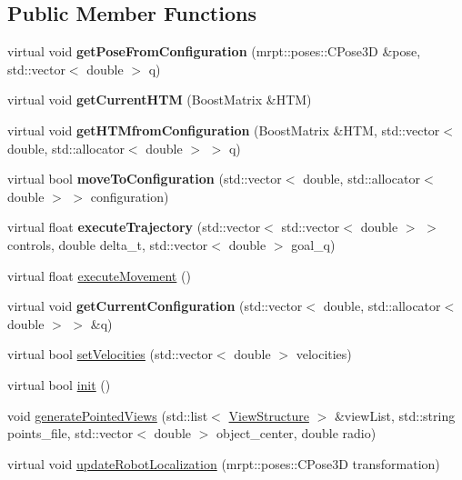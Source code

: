 \subsection*{Public Member Functions}
\begin{DoxyCompactItemize}
\item 
virtual void {\bfseries get\+Pose\+From\+Configuration} (mrpt\+::poses\+::\+C\+Pose3D \&pose, std\+::vector$<$ double $>$ q)\hypertarget{classvprFreeFlyer_ab6d24adbcd9c30b464dae8b036468394}{}\label{classvprFreeFlyer_ab6d24adbcd9c30b464dae8b036468394}

\item 
virtual void {\bfseries get\+Current\+H\+TM} (Boost\+Matrix \&H\+TM)\hypertarget{classvprFreeFlyer_ad90b7ba9c7aab39f3b27742fb3e4832d}{}\label{classvprFreeFlyer_ad90b7ba9c7aab39f3b27742fb3e4832d}

\item 
virtual void {\bfseries get\+H\+T\+Mfrom\+Configuration} (Boost\+Matrix \&H\+TM, std\+::vector$<$ double, std\+::allocator$<$ double $>$ $>$ q)\hypertarget{classvprFreeFlyer_a4ddb9bef245d3aec62cf843e29364a52}{}\label{classvprFreeFlyer_a4ddb9bef245d3aec62cf843e29364a52}

\item 
virtual bool {\bfseries move\+To\+Configuration} (std\+::vector$<$ double, std\+::allocator$<$ double $>$ $>$ configuration)\hypertarget{classvprFreeFlyer_a3363bcae45eb475c8785ff2a08f43109}{}\label{classvprFreeFlyer_a3363bcae45eb475c8785ff2a08f43109}

\item 
virtual float {\bfseries execute\+Trajectory} (std\+::vector$<$ std\+::vector$<$ double $>$ $>$ controls, double delta\+\_\+t, std\+::vector$<$ double $>$ goal\+\_\+q)\hypertarget{classvprFreeFlyer_ada428e9717d0e11e892215a4934bfa93}{}\label{classvprFreeFlyer_ada428e9717d0e11e892215a4934bfa93}

\item 
virtual float \hyperlink{classvprFreeFlyer_a8addee690a582bc74577ad79da7f02ba}{execute\+Movement} ()
\item 
virtual void {\bfseries get\+Current\+Configuration} (std\+::vector$<$ double, std\+::allocator$<$ double $>$ $>$ \&q)\hypertarget{classvprFreeFlyer_a17407e2a36c81f754e59ef2619b3f43d}{}\label{classvprFreeFlyer_a17407e2a36c81f754e59ef2619b3f43d}

\item 
virtual bool \hyperlink{classvprFreeFlyer_a9f1f0452b42a29b9cbef9cff075387ce}{set\+Velocities} (std\+::vector$<$ double $>$ velocities)
\item 
virtual bool \hyperlink{classvprFreeFlyer_a28a63f561bd1d740977a1050f10843b1}{init} ()
\item 
void \hyperlink{classvprFreeFlyer_af03adddc180ac01f0a3a49327bd763d1}{generate\+Pointed\+Views} (std\+::list$<$ \hyperlink{classViewStructure}{View\+Structure} $>$ \&view\+List, std\+::string points\+\_\+file, std\+::vector$<$ double $>$ object\+\_\+center, double radio)
\item 
virtual void \hyperlink{classvprFreeFlyer_a65e4457b0c4bb9dbf0eaf9e8cca3daa0}{update\+Robot\+Localization} (mrpt\+::poses\+::\+C\+Pose3D transformation)
\end{DoxyCompactItemize}
